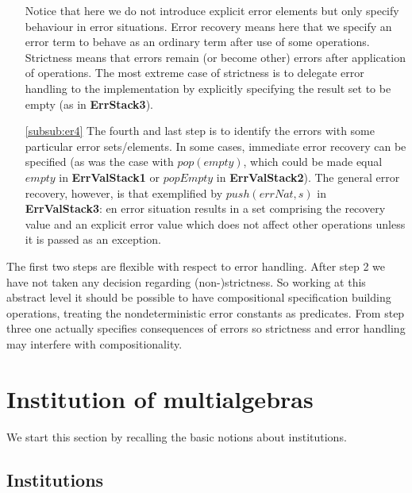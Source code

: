 \documentclass[10pt]{article}
\begin{document}
\begin{enumerate}
	Notice that here we do not introduce explicit error elements but only
	specify behaviour in error situations. Error recovery means here that we specify an error term to
	behave as an ordinary term after use of some operations. Strictness
	means that errors remain (or become other) errors after application of
	operations. The most extreme case of strictness is to delegate error
	handling to the implementation by explicitly specifying the result
	set to be empty (as in {\bf ErrStack3}).

\item[\ref{subsub:er4}] The fourth and last step is to identify the errors with some
	particular error sets/elements. 
In some cases,
immediate error recovery can be specified (as was the case with $pop(empty)$,
which could be made equal $empty$ in {\bf ErrValStack1} or $popEmpty$ in {\bf
ErrValStack2}). The general error recovery, however, is that exemplified by
$push(errNat,s)$ in {\bf ErrValStack3}: en error situation results in a set
comprising the recovery value and an explicit error value which does not
affect other operations unless it is passed as an exception.
\end{enumerate}
%
The first two steps are flexible with respect to error handling. After step 2 we
have not taken any decision regarding (non-)strictness. So working at this
abstract level it should be possible to have compositional specification
building operations, treating the nondeterministic error constants as
predicates. From step three one actually specifies consequences of errors so
strictness and error handling may interfere with compositionality.



\section{Institution of multialgebras}
\label{se:inst}

We start this section by recalling the basic notions about institutions.
 
\subsection{Institutions}
\end{document}
